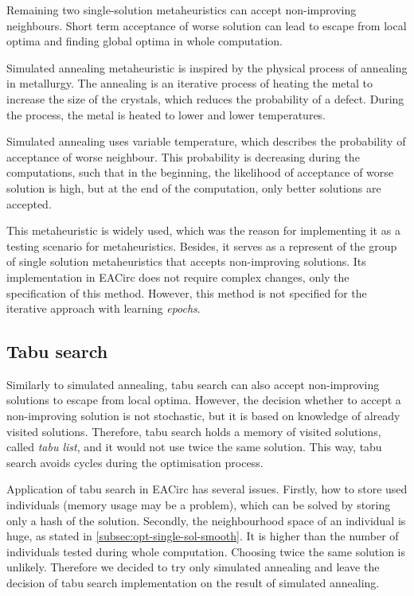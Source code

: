 \documentclass[
  print, %
  Table,   %
  nolof,     %
  nolot,     %
  11pt, %
  oneside  %
]{fithesis3}
\begin{document}
Remaining two single-solution metaheuristics can accept non-improving neighbours. Short term acceptance of worse solution can lead to escape from local optima and finding global optima in whole computation.

Simulated annealing metaheuristic is inspired by the physical process of annealing in metallurgy. The annealing is an iterative process of heating the metal to increase the size of the crystals, which reduces the probability of a defect. During the process, the metal is heated to lower and lower temperatures.

Simulated annealing uses variable temperature, which describes the probability of acceptance of worse neighbour. This probability is decreasing during the computations, such that in the beginning, the likelihood of acceptance of worse solution is high, but at the end of the computation, only better solutions are accepted.

This metaheuristic is widely used, which was the reason for implementing it as a testing scenario for metaheuristics. Besides, it serves as a represent of the group of single solution metaheuristics that accepts non-improving solutions. Its implementation in EACirc does not require complex changes, only the specification of this method. However, this method is not specified for the iterative approach with learning \textit{epochs}.

\subsection{Tabu search}
\label{subsec:opt-single-sol-tabu}

Similarly to simulated annealing, tabu search can also accept non-improving solutions to escape from local optima. However, the decision whether to accept a non-improving solution is not stochastic, but it is based on knowledge of already visited solutions. Therefore, tabu search holds a memory of visited solutions, called \textit{tabu list}, and it would not use twice the same solution. This way, tabu search avoids cycles during the optimisation process.

Application of tabu search in EACirc has several issues. Firstly, how to store used individuals (memory usage may be a problem), which can be solved by storing only a hash of the solution. Secondly, the neighbourhood space of an individual is huge, as stated in \cref{subsec:opt-single-sol-smooth}. It is higher than the number of individuals tested during whole computation. Choosing twice the same solution is unlikely. Therefore we decided to try only simulated annealing and leave the decision of tabu search implementation on the result of simulated annealing.
\end{document}
